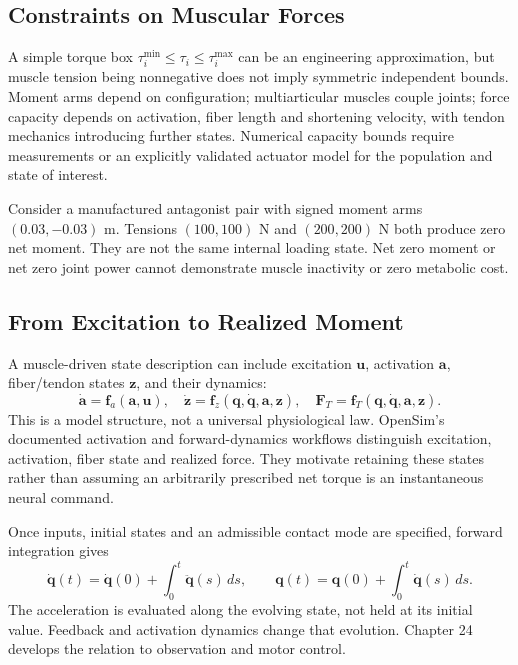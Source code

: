 \subsection*{Constraints on Muscular Forces}

A simple torque box \(\tau_i^{\min}\leq\tau_i\leq\tau_i^{\max}\) can be an engineering approximation, but muscle tension being nonnegative does not imply symmetric independent bounds. Moment arms depend on configuration; multiarticular muscles couple joints; force capacity depends on activation, fiber length and shortening velocity, with tendon mechanics introducing further states. Numerical capacity bounds require measurements or an explicitly validated actuator model for the population and state of interest.

Consider a manufactured antagonist pair with signed moment arms \((0.03,-0.03)\) m. Tensions \((100,100)\) N and \((200,200)\) N both produce zero net moment. They are not the same internal loading state. Net zero moment or net zero joint power cannot demonstrate muscle inactivity or zero metabolic cost.

\subsection*{From Excitation to Realized Moment}

A muscle-driven state description can include excitation \(\bm u\), activation \(\bm a\), fiber/tendon states \(\bm z\), and their dynamics:
\[
\dot{\bm a}=\bm f_a(\bm a,\bm u),\quad
\dot{\bm z}=\bm f_z(\bm q,\dot{\bm q},\bm a,\bm z),\quad
\bm F_T=\bm f_T(\bm q,\dot{\bm q},\bm a,\bm z).
\]
This is a model structure, not a universal physiological law. OpenSim's documented activation and forward-dynamics workflows distinguish excitation, activation, fiber state and realized force. They motivate retaining these states rather than assuming an arbitrarily prescribed net torque is an instantaneous neural command. \citep{OpenSimActivationDynamics,OpenSimForward2024}

Once inputs, initial states and an admissible contact mode are specified, forward integration gives
\begin{equation}
\dot{\bm q}(t)=\dot{\bm q}(0)+\int_0^t\ddot{\bm q}(s)\,ds,\qquad
\bm q(t)=\bm q(0)+\int_0^t\dot{\bm q}(s)\,ds.
\label{eq:ch04_integration}
\end{equation}
The acceleration is evaluated along the evolving state, not held at its initial value. Feedback and activation dynamics change that evolution. Chapter 24 develops the relation to observation and motor control.

